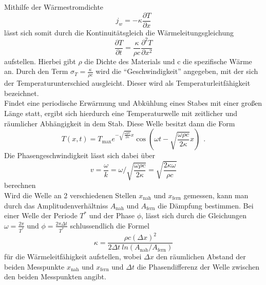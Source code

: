 \noindent Mithilfe der Wärmestromdichte
\begin{equation}
  j_w = - \kappa \frac{\partial T}{\partial x}
  \label{eqn:wstrom}
\end{equation}
lässt sich somit durch die Kontinuitätsgleich die Wärmeleitungsgleichung
\begin{equation}
  \frac{\partial T}{\partial t} = \frac{\kappa}{\rho c} \frac{\partial ^2 T}{\partial x^2}
  \label{eqn:wleit}
\end{equation}
aufstellen. Hierbei gibt $ \rho $ die Dichte des Materials und c die spezifische Wärme
an.
Durch den Term $ \sigma_T =\frac{\kappa}{\rho c} $ wird die “Geschwindigkeit” angegeben, mit
der sich der Temperaturunterschied ausgleicht. Dieser wird als
Temperaturleitfähigkeit bezeichnet.
\\
Findet eine periodische Erwärmung und Abkühlung eines Stabes mit einer großen Länge statt,
ergibt sich hierdurch eine Temperaturwelle mit zeitlicher und räumlicher Abhängigkeit
in dem Stab. Diese Welle besitzt dann die Form
\begin{equation}
  T(x,t) = T_{\text{max}} e^{-\sqrt{\frac{\omega \rho c}{2 \kappa}}x}
  \cos (\omega t - \sqrt{\frac{\omega \rho c}{2 \kappa}}x)  \: \: .
  \label{eqn:welle}
\end{equation}
Die Phasengeschwindigkeit lässt sich dabei über
\begin{equation}
   v = \frac{\omega}{k} = \omega / \sqrt{\frac{\omega \rho c}{2 \kappa}}
   = \sqrt{\frac{2 \kappa \omega}{\rho c}}
   \label{eqn:vphase}
 \end{equation}
berechnen
\\
Wird die Welle an 2 verschiedenen Stellen $x_{\text{nah}}$ und $x_{\text{fern}}$ gemessen,
kann man durch das Amplitudenverhältniss $A_{\text{nah}}$ und $A_{\text{fern}}$
die Dämpfung bestimmen.
Bei einer Welle der Periode $T^* $ und der Phase $ \phi$, lässt sich durch die Gleichungen
$ \omega = \frac{2\pi}{T^*} $ und $ \phi = \frac{2\pi \Delta t}{T^*} $ schlussendlich
die Formel
\begin{equation}
  \kappa = \frac{\rho c (\Delta x)^2}{2 \Delta t \: ln(A_{\text{nah}}/A_{\text{fern}})}
  \label{eqn:leitf}
\end{equation}
für die Wärmeleitfähigkeit aufstellen, wobei $\Delta x$ den räumlichen Abstand der
beiden Messpunkte $x_{\text{nah}}$ und $x_{\text{fern}}$ und $\Delta t $ die Phasendifferenz
der Welle zwischen den beiden Messpunkten angibt.
